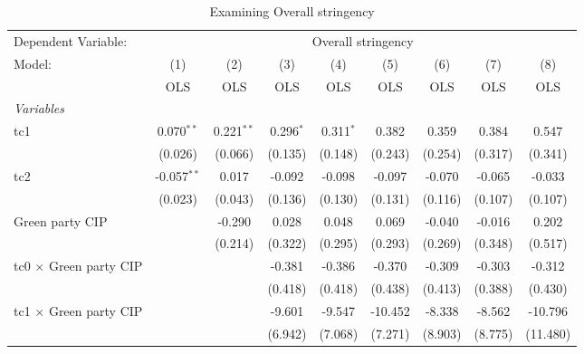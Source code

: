 
\begin{table}[htbp]
   \caption{Examining Overall stringency}
   \centering
   \begin{tabular}{lcccccccc}
      \toprule
      Dependent Variable: & \multicolumn{8}{c}{Overall stringency}\\
      Model:                                  & (1)           & (2)          & (3)         & (4)         & (5)     & (6)     & (7)     & (8)\\  
                                              &  OLS          & OLS          & OLS         & OLS         & OLS     & OLS     & OLS     & OLS\\  
      \midrule
      \emph{Variables}\\
      tc1                                     & 0.070$^{**}$  & 0.221$^{**}$ & 0.296$^{*}$ & 0.311$^{*}$ & 0.382   & 0.359   & 0.384   & 0.547\\   
                                              & (0.026)       & (0.066)      & (0.135)     & (0.148)     & (0.243) & (0.254) & (0.317) & (0.341)\\   
      tc2                                     & -0.057$^{**}$ & 0.017        & -0.092      & -0.098      & -0.097  & -0.070  & -0.065  & -0.033\\   
                                              & (0.023)       & (0.043)      & (0.136)     & (0.130)     & (0.131) & (0.116) & (0.107) & (0.107)\\   
      Green party CIP                         &               & -0.290       & 0.028       & 0.048       & 0.069   & -0.040  & -0.016  & 0.202\\   
                                              &               & (0.214)      & (0.322)     & (0.295)     & (0.293) & (0.269) & (0.348) & (0.517)\\   
      tc0 $\times$ Green party CIP            &               &              & -0.381      & -0.386      & -0.370  & -0.309  & -0.303  & -0.312\\   
                                              &               &              & (0.418)     & (0.418)     & (0.438) & (0.413) & (0.388) & (0.430)\\   
      tc1 $\times$ Green party CIP            &               &              & -9.601      & -9.547      & -10.452 & -8.338  & -8.562  & -10.796\\   
                                              &               &              & (6.942)     & (7.068)     & (7.271) & (8.903) & (8.775) & (11.480)\\   

\end{tabular}
\end{table}
